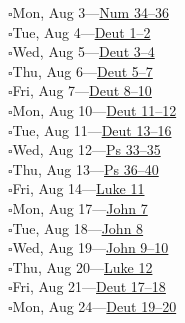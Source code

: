 \hypertarget{rp-2026-08-03}{}\noindent$\square$\enspace Mon, Aug 3\enspace---\enspace \hyperlink{ch-numbers-34}{Num 34--36}\\
\hypertarget{rp-2026-08-04}{}\noindent$\square$\enspace Tue, Aug 4\enspace---\enspace \hyperlink{ch-deuteronomy-1}{Deut 1--2}\\
\hypertarget{rp-2026-08-05}{}\noindent$\square$\enspace Wed, Aug 5\enspace---\enspace \hyperlink{ch-deuteronomy-3}{Deut 3--4}\\
\hypertarget{rp-2026-08-06}{}\noindent$\square$\enspace Thu, Aug 6\enspace---\enspace \hyperlink{ch-deuteronomy-5}{Deut 5--7}\\
\hypertarget{rp-2026-08-07}{}\noindent$\square$\enspace Fri, Aug 7\enspace---\enspace \hyperlink{ch-deuteronomy-8}{Deut 8--10}\\
\hypertarget{rp-2026-08-10}{}\noindent$\square$\enspace Mon, Aug 10\enspace---\enspace \hyperlink{ch-deuteronomy-11}{Deut 11--12}\\
\hypertarget{rp-2026-08-11}{}\noindent$\square$\enspace Tue, Aug 11\enspace---\enspace \hyperlink{ch-deuteronomy-13}{Deut 13--16}\\
\hypertarget{rp-2026-08-12}{}\noindent$\square$\enspace Wed, Aug 12\enspace---\enspace \hyperlink{ch-psalms-33}{Ps 33--35}\\
\hypertarget{rp-2026-08-13}{}\noindent$\square$\enspace Thu, Aug 13\enspace---\enspace \hyperlink{ch-psalms-36}{Ps 36--40}\\
\hypertarget{rp-2026-08-14}{}\noindent$\square$\enspace Fri, Aug 14\enspace---\enspace \hyperlink{ch-luke-11}{Luke 11}\\
\hypertarget{rp-2026-08-17}{}\noindent$\square$\enspace Mon, Aug 17\enspace---\enspace \hyperlink{ch-john-7}{John 7}\\
\hypertarget{rp-2026-08-18}{}\noindent$\square$\enspace Tue, Aug 18\enspace---\enspace \hyperlink{ch-john-8}{John 8}\\
\hypertarget{rp-2026-08-19}{}\noindent$\square$\enspace Wed, Aug 19\enspace---\enspace \hyperlink{ch-john-9}{John 9--10}\\
\hypertarget{rp-2026-08-20}{}\noindent$\square$\enspace Thu, Aug 20\enspace---\enspace \hyperlink{ch-luke-12}{Luke 12}\\
\hypertarget{rp-2026-08-21}{}\noindent$\square$\enspace Fri, Aug 21\enspace---\enspace \hyperlink{ch-deuteronomy-17}{Deut 17--18}\\
\hypertarget{rp-2026-08-24}{}\noindent$\square$\enspace Mon, Aug 24\enspace---\enspace \hyperlink{ch-deuteronomy-19}{Deut 19--20}\\
